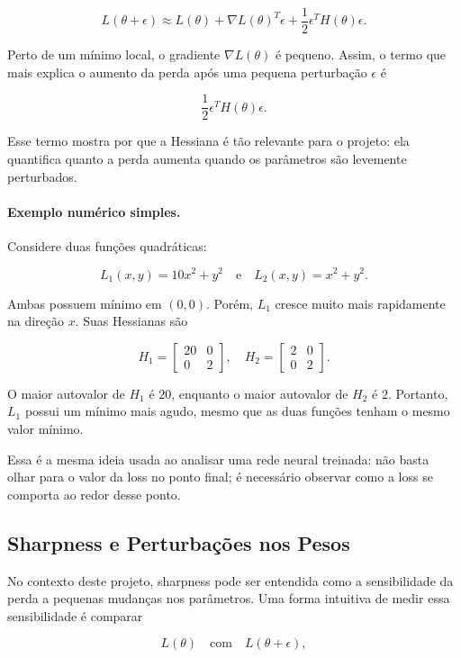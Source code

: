 \documentclass[12pt, a4paper]{article}
\begin{document}
\[
L(\theta + \epsilon)
\approx
L(\theta)
+
\nabla L(\theta)^T \epsilon
+
\frac{1}{2}\epsilon^T H(\theta)\epsilon.
\]

Perto de um mínimo local, o gradiente \(\nabla L(\theta)\) é pequeno. Assim, o
termo que mais explica o aumento da perda após uma pequena perturbação
\(\epsilon\) é

\[
\frac{1}{2}\epsilon^T H(\theta)\epsilon.
\]

Esse termo mostra por que a Hessiana é tão relevante para o projeto: ela
quantifica quanto a perda aumenta quando os parâmetros são levemente
perturbados.

\paragraph{Exemplo numérico simples.}

Considere duas funções quadráticas:

\[
L_1(x,y)=10x^2+y^2
\quad \text{e} \quad
L_2(x,y)=x^2+y^2.
\]

Ambas possuem mínimo em \((0,0)\). Porém, \(L_1\) cresce muito mais rapidamente
na direção \(x\). Suas Hessianas são

\[
H_1=
\begin{bmatrix}
20&0\\
0&2
\end{bmatrix},
\quad
H_2=
\begin{bmatrix}
2&0\\
0&2
\end{bmatrix}.
\]

O maior autovalor de \(H_1\) é \(20\), enquanto o maior autovalor de \(H_2\) é
\(2\). Portanto, \(L_1\) possui um mínimo mais agudo, mesmo que as duas funções
tenham o mesmo valor mínimo.

Essa é a mesma ideia usada ao analisar uma rede neural treinada: não basta
olhar para o valor da loss no ponto final; é necessário observar como a loss
se comporta ao redor desse ponto.

\subsection{Sharpness e Perturbações nos Pesos}

No contexto deste projeto, sharpness pode ser entendida como a sensibilidade da
perda a pequenas mudanças nos parâmetros. Uma forma intuitiva de medir essa
sensibilidade é comparar

\[
L(\theta)
\quad \text{com} \quad
L(\theta + \epsilon),
\]
\end{document}
